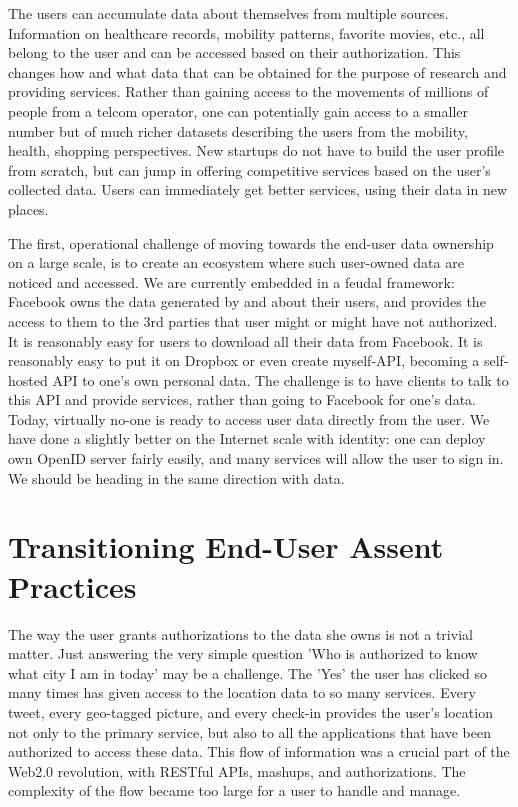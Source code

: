 The users can accumulate data about themselves from multiple sources.
Information on healthcare records, mobility patterns, favorite movies, etc., all belong to the user and can be accessed based on their authorization.
This changes how and what data that can be obtained for the purpose of research and providing services.
Rather than gaining access to the movements of millions of people from a telcom operator, one can potentially gain access to a smaller number but of much richer datasets describing the users from the mobility, health, shopping perspectives.
New startups do not have to build the user profile from scratch, but can jump in offering competitive services based on the user's collected data.
Users can immediately get better services, using their data in new places.

The first, operational challenge of moving towards the end-user data ownership on a large scale, is to create an ecosystem where such user-owned data are noticed and accessed.
We are currently embedded in a feudal framework: Facebook owns the data generated by and about their users, and provides the access to them to the 3rd parties that user might or might have not authorized.
It is reasonably easy for users to download all their data from Facebook.
It is reasonably easy to put it on Dropbox or even create myself-API, becoming a self-hosted API to one's own personal data.
The challenge is to have clients to talk to this API and provide services, rather than going to Facebook for one's data.
Today, virtually no-one is ready to access user data directly from the user.
We have done a slightly better on the Internet scale with identity: one can deploy own OpenID server fairly easily, and many services will allow the user to sign in.
We should be heading in the same direction with data.

\section{Transitioning End-User Assent Practices}

The way the user grants authorizations to the data she owns is not a trivial matter.
Just answering the very simple question 'Who is authorized to know what city I am in today' may be a challenge.
The 'Yes' the user has clicked so many times has given access to the location data to so many services.
Every tweet, every geo-tagged picture, and every check-in provides the user's location not only to the primary service, but also to all the applications that have been authorized to access these data.
This flow of information was a crucial part of the Web2.0 revolution, with RESTful APIs, mashups, and authorizations.
The complexity of the flow became too large for a user to handle and manage.

